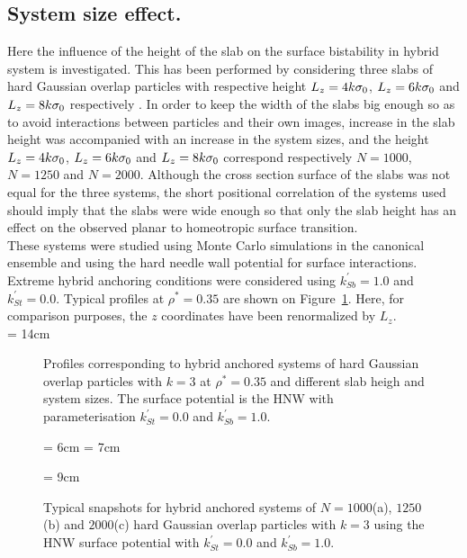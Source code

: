 \subsection{System size effect.}
\label{ss:sizeEffect}

Here the influence of the height of the slab on the surface bistability in hybrid system is
investigated. This has been performed by considering three slabs of hard Gaussian overlap
particles with respective height $L_z=4k\sigma_0$, $L_z=6k\sigma_0$ and $L_z=8k\sigma_0$ respectively . In
order to keep the width of the slabs big enough so as to avoid interactions between
particles and their own images, increase in the slab height was accompanied with an
increase in the system sizes, and the height $L_z=4k\sigma_0$, $L_z=6k\sigma_0$ and $L_z=8k\sigma_0$
correspond respectively $N=1000$, $N=1250$ and $N=2000$. Although the
cross section surface of the slabs was not equal for the three systems, the short positional
correlation of the systems used should imply that the slabs were wide enough so that only the
slab height has an effect on the observed planar to homeotropic surface transition.\\
These systems were studied using Monte Carlo simulations in the canonical ensemble and
using the hard needle wall potential for surface interactions. Extreme hybrid anchoring
conditions were considered using $k^\prime_{Sb}=1.0$ and $k^\prime_{St}=0.0$. Typical
profiles at $\rho^{*}=0.35$ are shown on Figure~\ref{fig:HGO_Hconf_typeProfile_Size}. Here, for
comparison purposes, the $z$ coordinates have been renormalized by $L_z$.\\


\picW = 14cm
\begin{figure}
	\centering
	\caption{Profiles corresponding to hybrid anchored systems of hard Gaussian overlap
	particles with $k=3$ at $\rho^{*}=0.35$ and different slab heigh and system sizes. 
	The surface potential is the HNW with parameterisation $k^\prime_{St}=0.0$ and 
	$k^\prime_{Sb}=1.0$.}
	\label{fig:HGO_Hconf_typeProfile_Size}
\end{figure}

\begin{figure}
	\centering
	\picW = 6cm
	\picW = 7cm

	\picW = 9cm
	\caption{Typical snapshots for hybrid anchored systems of $N=1000$(a), $1250$(b) and
	$2000$(c) hard Gaussian overlap particles with $k=3$ using the HNW surface potential
	with $k^\prime_{St}=0.0$ and $k^\prime_{Sb}=1.0$.}
	\label{fig:HGO_Hconf_snapsSize}
\end{figure}


